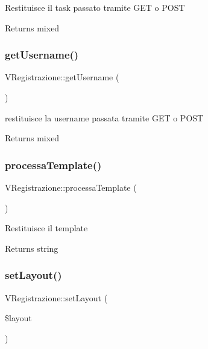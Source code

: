 Restituisce il task passato tramite G\+ET o P\+O\+ST

\begin{DoxyReturn}{Returns}
mixed 
\end{DoxyReturn}
\mbox{\label{class_v_registrazione_a4aefbbdc87649de9c8ae8c8f9d70310a}} 
\subsubsection{\texorpdfstring{get\+Username()}{getUsername()}}
{\footnotesize\ttfamily V\+Registrazione\+::get\+Username (\begin{DoxyParamCaption}{ }\end{DoxyParamCaption})}

restituisce la username passata tramite G\+ET o P\+O\+ST

\begin{DoxyReturn}{Returns}
mixed 
\end{DoxyReturn}
\mbox{\label{class_v_registrazione_af24b75acb63fb916d4e3d7b586aa70f5}} 
\subsubsection{\texorpdfstring{processa\+Template()}{processaTemplate()}}
{\footnotesize\ttfamily V\+Registrazione\+::processa\+Template (\begin{DoxyParamCaption}{ }\end{DoxyParamCaption})}

Restituisce il template

\begin{DoxyReturn}{Returns}
string 
\end{DoxyReturn}
\mbox{\label{class_v_registrazione_afacb525933c2c700abd6758f18dd2516}} 
\subsubsection{\texorpdfstring{set\+Layout()}{setLayout()}}
{\footnotesize\ttfamily V\+Registrazione\+::set\+Layout (\begin{DoxyParamCaption}\item[{}]{\$layout }\end{DoxyParamCaption})}


